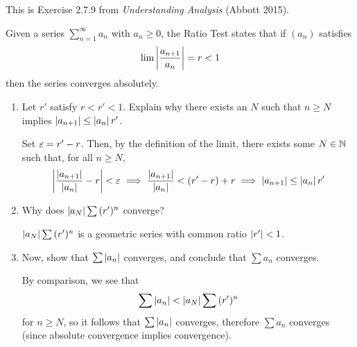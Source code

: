 \begin{problem}
  \leavevmode\par\noindent

  \begin{callout}
    This is Exercise 2.7.9 from \textit{Understanding Analysis} (Abbott 2015).
  \end{callout}

  \begin{definition}
    Given a series $\sum_{n=1}^{\infty} a_{n}$ with $a_{n} \geq 0$, the Ratio Test states that if $(a_{n})$ 
    satisfies
    \[
      \lim \left\lvert \frac{a_{n+1}}{a_{n}} \right\rvert = r < 1
    \]
    then the series converges absolutely.
  \end{definition}

  \begin{enumerate}[label=(\alph*)]
    \item Let $r'$ satisfy $r < r' < 1$. Explain why there exists an $N$ such that $n \geq N$ implies 
      $\left\lvert a_{n+1} \right\rvert \leq \left\lvert a_{n} \right\rvert r'$.
      \vspace{\baselineskip}
      
      Set $\varepsilon = r' - r$. Then, by the definition of the limit, there exists some $N \in \mathbb{N}$ such that,
      for all $n \geq N$,
      \[
        \left\lvert \frac{\left\lvert a_{n+1} \right\rvert}{\left\lvert a_{n} \right\rvert} - r \right\rvert < \varepsilon \implies \frac{\left\lvert a_{n+1} \right\rvert}{\left\lvert a_{n} \right\rvert} < (r' - r) + r \implies \left\lvert a_{n+1} \right\rvert \leq \left\lvert a_{n} \right\rvert r'
      \]

    \item Why does $\left\lvert a_{N} \right\rvert \sum{(r')^{n}}$ converge?
      \vspace{\baselineskip}

      $\left\lvert a_{N} \right\rvert \sum{(r')^{n}}$ is a geometric series with common ratio $\left\lvert r' \right\rvert < 1$.

    \item Now, show that $\sum{\left\lvert a_{n} \right\rvert}$ converges, and conclude that $\sum{a_{n}}$ converges.
      \vspace{\baselineskip}

      By comparison, we see that
      \[
        \sum{\left\lvert a_{n} \right\rvert} < \left\lvert a_{N} \right\rvert \sum{(r')^{n}}
      \]
      for $n \geq N$, so it follows that $\sum{\left\lvert a_{n} \right\rvert}$ converges,
      therefore $\sum{a_{n}}$ converges (since absolute convergence implies
      convergence).
  \end{enumerate}

\end{problem}

